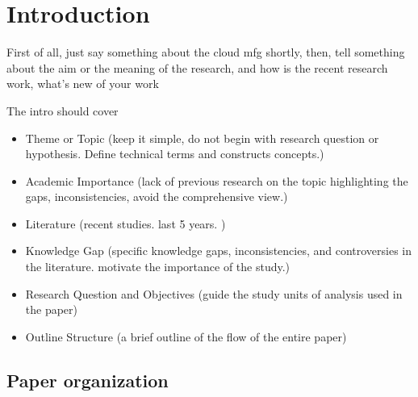 \section{Introduction}
First of all, just say something about the cloud mfg shortly,
then, tell something about the aim or the meaning of the research,
and how is the recent research work, what's new of your work 


The intro should cover 
\begin{itemize}
	\item Theme or Topic (keep it simple, do not begin with research question or hypothesis. Define technical terms and constructs concepts.)
	\item Academic Importance (lack of previous research on the topic highlighting the gaps, inconsistencies, avoid the comprehensive view.)
	\item Literature (recent studies. last 5 years. )
	\item Knowledge Gap (specific knowledge gaps, inconsistencies, and controversies in the literature. motivate the importance of the study.)
	\item Research Question and Objectives (guide the study units of analysis used in the paper)
	\item Outline Structure (a brief outline of the flow of the entire paper)
\end{itemize}


\subsection{Paper organization} %
\label{sub:paper_organization}

